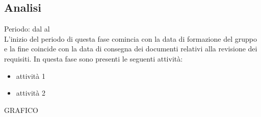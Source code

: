 \subsection{Analisi}
Periodo: dal al\\
L'inizio del periodo di questa fase comincia con la data di formazione del gruppo e la fine coincide con la data di consegna dei documenti relativi alla revisione dei requisiti. In questa fase sono presenti le seguenti attività:
\begin{itemize}
\item attività 1
\item attività 2
\end{itemize}

GRAFICO